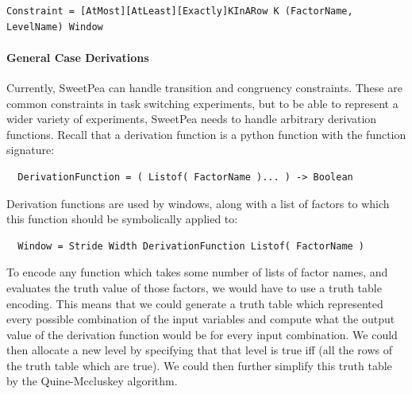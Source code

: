 \begin{verbatim}
Constraint = [AtMost][AtLeast][Exactly]KInARow K (FactorName, LevelName) Window
\end{verbatim}

\paragraph*{General Case Derivations}

Currently, SweetPea can handle transition and congruency constraints. These are common constraints in task switching experiments, but to be able to represent a wider variety of experiments, SweetPea needs to handle arbitrary derivation functions. Recall that a derivation function is a python function with the function signature:

\begin{verbatim}
  DerivationFunction = ( Listof( FactorName )... ) -> Boolean
\end{verbatim}

Derivation functions are used by windows, along with a list of factors to which this function should be symbolically applied to:

\begin{verbatim}
  Window = Stride Width DerivationFunction Listof( FactorName )
\end{verbatim}

To encode any function which takes some number of lists of factor names, and evaluates the truth value of those factors, we would have to use a truth table encoding. This means that we could generate a truth table which represented every possible combination of the input variables and compute what the output value of the derivation function would be for every input combination. We could then allocate a new level by specifying that that level is true iff (all the rows of the truth table which are true). We could then further simplify this truth table by the Quine-Mccluskey algorithm.

%
%
%

